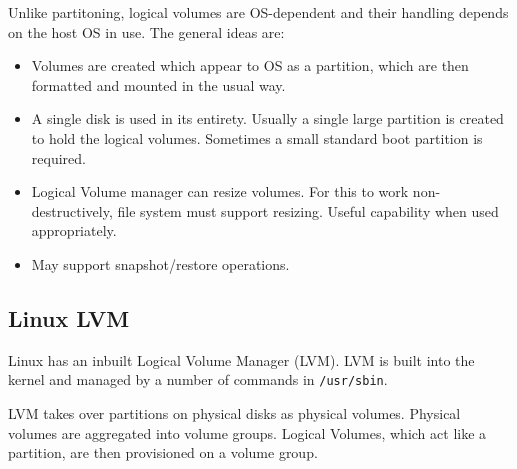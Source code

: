 Unlike partitoning, logical volumes are OS-dependent and their handling
depends on the host OS in use. The general ideas are:

\begin{itemize}
\item
  Volumes are created which appear to OS as a partition, which are then
  formatted and mounted in the usual way.
\item
  A single disk is used in its entirety. Usually a single large
  partition is created to hold the logical volumes. Sometimes a small
  standard boot partition is required.
\item
  Logical Volume manager can resize volumes. For this to work
  non-destructively, file system must support resizing. Useful
  capability when used appropriately.
\item
  May support snapshot/restore operations.
\end{itemize}

\subsection{Linux LVM}
\label{sec:linux-lvm}

Linux has an inbuilt Logical Volume Manager (LVM). LVM is built into the
kernel and managed by a number of commands in \texttt{/usr/sbin}.

LVM takes over partitions on physical disks as physical volumes.
Physical volumes are aggregated into volume groups. Logical Volumes,
which act like a partition, are then provisioned on a volume group.

